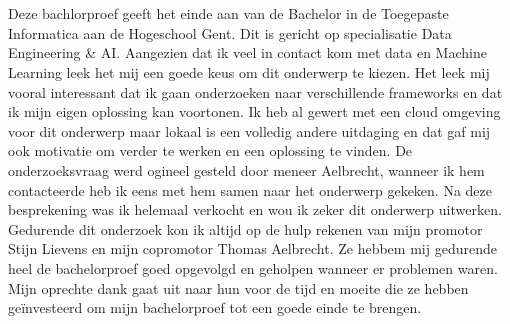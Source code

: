 
\chapter*{}%
\label{ch:voorwoord}
Deze bachlorproef geeft het einde aan van de Bachelor in de Toegepaste Informatica aan de Hogeschool Gent. Dit is gericht op specialisatie Data Engineering & AI. Aangezien dat ik veel in contact kom met data en Machine Learning leek het mij een goede keus om dit onderwerp te kiezen. Het leek mij vooral interessant dat ik gaan onderzoeken naar verschillende frameworks en dat ik mijn eigen oplossing kan voortonen.
Ik heb al gewert met een cloud omgeving voor dit onderwerp maar lokaal is een volledig andere uitdaging en dat gaf mij ook motivatie om verder te werken en een oplossing te vinden. De onderzoeksvraag werd ogineel gesteld door meneer Aelbrecht, wanneer ik hem contacteerde heb ik eens met hem samen naar het onderwerp gekeken.
Na deze besprekening was ik helemaal verkocht en wou ik zeker dit onderwerp uitwerken. Gedurende dit onderzoek kon ik altijd op de hulp rekenen van mijn promotor Stijn Lievens en mijn copromotor Thomas Aelbrecht. Ze hebbem mij gedurende heel de bachelorproef goed opgevolgd en geholpen wanneer er problemen waren. Mijn oprechte dank gaat uit naar hun voor de tijd en moeite die ze hebben geïnvesteerd om mijn bachelorproef tot een goede einde te brengen.
